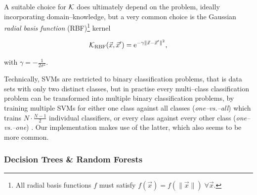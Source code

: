 A suitable choice for $\mathcal{K}$ does ultimately depend on the problem, ideally incorporating domain--knowledge, but a very common choice is the Gaussian \emph{radial basis function} (RBF)\footnote{All radial basis functions $f$ must satisfy $f(\vec x) = f(\|\vec x\|) \; \forall \vec x$.} kernel

\begin{equation}
\label{eq:rbf}
\mathcal{K}_{\text{RBF}}(\vec x, \vec x') = \mathrm{e}^{-\gamma \| \vec x - \vec x' \|^2},
\end{equation}

with $\gamma = -\frac{1}{2 \sigma^2}$.\\

Technically, SVMs are restricted to binary classification problems, that is data sets with only two distinct classes, but in practise every multi--class classification problem can be transformed into multiple binary classification problems, \eg by training multiple SVMs for either one class against all classes (\emph{one--vs.--all}) which trains $N \cdot \frac{N-1}{2}$ individual classifiers, or every class against every other class (\emph{one--vs.--one}) \citep{knerr1990}. Our implementation makes use of the latter, which also seems to be more common.


\subsubsection{Decision Trees \& Random Forests}

